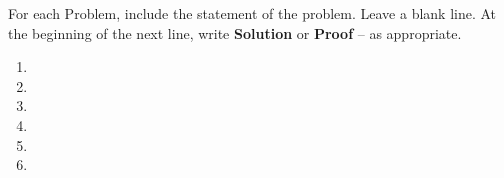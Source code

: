 For each Problem, include the statement of the problem. Leave a blank line.  At the beginning of the next line, write \textbf{Solution} or \textbf{Proof} -- as appropriate.

\begin{enumerate}
    \item 
    \newpage
    \item 
    \vspace{1.2in}
    \item 
    \vspace{1.5in}
    \item 
    
    \newpage
    \item 
    
    \newpage
    \item 
    
    \end{enumerate}